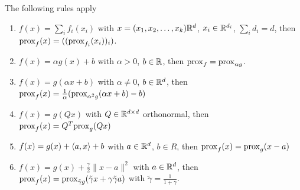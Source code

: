 \begin{lemma}
    The following rules apply
    \begin{enumerate}
        \item $f(x) = \sum_i f_i(x_i)$ with $x = (x_1,x_2,\dots,x_k)\mathbb{R}^d$, $x_i\in\mathbb{R}^{d_i}$, $\sum_i d_i = d$, then $\mathrm{prox}_{f}(x) = ((\mathrm{prox}_{f_i}(x_i))_i)$.
        \item $f(x)=\alpha g(x) + b$ with $\alpha>0$, $b\in \mathbb{R}$, then $\mathrm{prox}_f = \mathrm{prox}_{\alpha g}$.
        \item $f(x)=g(\alpha x+ b)$ with $\alpha\neq 0$, $b\in\mathbb{R}^d$, then $\mathrm{prox}_f(x) = \frac{1}{\alpha}(\mathrm{prox}_{\alpha^2 g}(\alpha x + b)-b)$
        \item $f(x) = g(Qx)$ with $Q\in\mathbb{R}^{d\times d}$ orthonormal, then $\mathrm{prox}_f(x) = Q^T\mathrm{prox}_{g}(Qx)$
        \item $f(x) = g(x) + \left\langle a , x\right\rangle + b$ with $a\in\mathbb{R}^d$, $b\in R$, then $\mathrm{prox}_{f}(x) = \mathrm{prox}_g (x-a)$
        \item $f(x) = g(x) + \frac{\gamma}{2}\|x-a\|^2$ with $a\in\mathbb{R}^d$, then $\mathrm{prox}_f(x) = \mathrm{prox}_{\tilde{\gamma}g}(\tilde{\gamma}x + \gamma\tilde{\gamma}a)$ with $\tilde{\gamma} = \frac{1}{1+\gamma}$.
    \end{enumerate}
\end{lemma}

